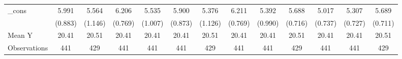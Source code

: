 {\begin{tabular}{l*{12}{c}}
\addlinespace
\_cons      &       5.991\sym{***}&       5.564\sym{***}&       6.206\sym{***}&       5.535\sym{***}&       5.900\sym{***}&       5.376\sym{***}&       6.211\sym{***}&       5.392\sym{***}&       5.688\sym{***}&       5.017\sym{***}&       5.307\sym{***}&       5.689\sym{***}\\
            &     (0.883)         &     (1.146)         &     (0.769)         &     (1.007)         &     (0.873)         &     (1.126)         &     (0.769)         &     (0.990)         &     (0.716)         &     (0.737)         &     (0.727)         &     (0.711)         \\
\midrule
Mean Y      &       20.41         &       20.51         &       20.41         &       20.41         &       20.41         &       20.51         &       20.41         &       20.41         &       20.51         &       20.41         &       20.41         &       20.51         \\
Observations&         441         &         429         &         441         &         441         &         441         &         429         &         441         &         441         &         429         &         441         &         441         &         429         \\
\bottomrule
\end{tabular}
}
